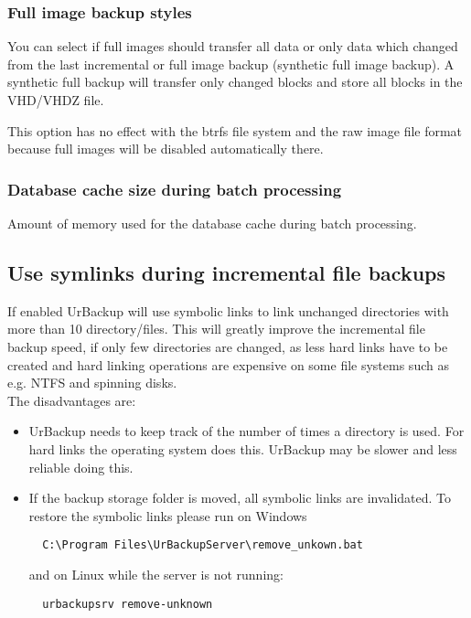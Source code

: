 \documentclass[a4paper,10pt]{article}
\begin{document}
\subsubsection{Full image backup styles}

You can select if full images should transfer all data or only data which changed from the last incremental or full image backup (synthetic full image backup). A synthetic full backup will transfer only changed blocks and store all blocks in the VHD/VHDZ file.

\par\null\par
This option has no effect with the btrfs file system and the raw image file format because full images will be disabled automatically there.

\subsubsection{Database cache size during batch processing}

Amount of memory used for the database cache during batch processing.

\subsection{Use symlinks during incremental file backups}

If enabled UrBackup will use symbolic links to link unchanged directories with more than 10 directory/files. This will greatly improve the incremental file backup speed, if only few directories are changed, as less hard links have to be created and hard linking operations are expensive on some file systems such as e.g. NTFS and spinning disks.\\

The disadvantages are:

\begin{itemize}
  \item UrBackup needs to keep track of the number of times a directory is used. For hard links the operating system does this. UrBackup may be slower and less reliable doing this.
  \item If the backup storage folder is moved, all symbolic links are invalidated. To restore the symbolic links please run on Windows
  \begin{verbatim}
  C:\Program Files\UrBackupServer\remove_unkown.bat
  \end{verbatim}
  and on Linux while the server is not running:
  \begin{verbatim}
  urbackupsrv remove-unknown
  \end{verbatim}
  
\end{itemize}
\end{document}
